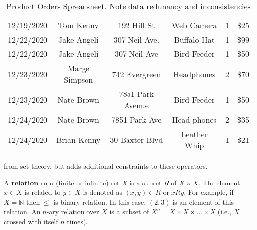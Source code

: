 \documentclass{article}
\begin{document}
 
\begin{table}[h!]
\caption{Product Orders Spreadsheet.  Note data redunancy and inconsistencies}
\begin{center}

\begin{tabular}{|c|c|c|c|c|c|}
   \hline
  \cellcolor{excel}{Date}  & \cellcolor{excel}{Customer} & \cellcolor{excel}{Address}
&
  \cellcolor{excel}{Product} & 
  \cellcolor{excel}{Qty} & 
  \cellcolor{excel}{Price} \\
  \hline
  12/19/2020 & Tom Kenny & 192 Hill St  & Web Camera  & 1 & \$25\\
      \hline
   12/22/2020 & Jake Angeli & 307 Neil Ave.  &  Buffalo Hat & 1 & \$99\\
  \hline
    12/22/2020 & Jake Angeli & 307 Neil Ave  &  Bird Feeder & 1 & \$50\\
    \hline
     12/23/2020 & Marge Simpson & 742 Evergreen   & Headphones  & 2 & \$70\\
     \hline
     12/23/2020 & Nate Brown & 7851 Park Avenue  & Bird Feeder  & 1 & \$50\\
     \hline
     12/24/2020 & Nate Brown & 7851 Park Ave  & Head phones  & 2 & \$35\\
     \hline
     12/24/2020 & Brian Kenny & 30 Baxter Blvd  & Leather Whip  & 1 & \$21\\
      \hline
\end{tabular}
\end{center}
\label{tab:flatfile}
\end{table}%










from set theory, but adds additional constraints to these operators.


A \textbf{relation} on a (finite or infinite) set $X$ is a subset $R$ of
$X \times X$.  The element $x \in X$ is related to $y \in X$ is denoted as
 $(x,y) \in R$ or $xRy$.  For example, if $X = \mathbb{N}$  then $\le$ is
binary relation. In this case, $(2,3)$ is an element of this relation.  An
$n$-ary relation over $X$ is a subset of $X^n = X \times X \times \dots 
\times X$ (i.e., $X$ crossed with itself $n$ times).   
 
\end{document}
